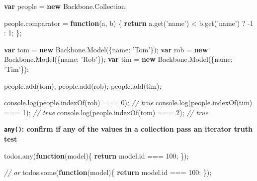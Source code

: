\documentclass[9pt]{book}
\newenvironment{Shaded}{}{}
\newcommand{\KeywordTok}[1]{\textcolor[rgb]{0.00,0.44,0.13}{\textbf{{#1}}}}
\newcommand{\DataTypeTok}[1]{\textcolor[rgb]{0.56,0.13,0.00}{{#1}}}
\newcommand{\DecValTok}[1]{\textcolor[rgb]{0.25,0.63,0.44}{{#1}}}
\newcommand{\StringTok}[1]{\textcolor[rgb]{0.25,0.44,0.63}{{#1}}}
\newcommand{\CommentTok}[1]{\textcolor[rgb]{0.38,0.63,0.69}{\textit{{#1}}}}
\newcommand{\OtherTok}[1]{\textcolor[rgb]{0.00,0.44,0.13}{{#1}}}
\newcommand{\FunctionTok}[1]{\textcolor[rgb]{0.02,0.16,0.49}{{#1}}}
\newcommand{\NormalTok}[1]{{#1}}
\begin{document}
\begin{Shaded}
\begin{Highlighting}[]
\KeywordTok{var} \NormalTok{people = }\KeywordTok{new} \OtherTok{Backbone}\NormalTok{.}\FunctionTok{Collection}\NormalTok{;}

\OtherTok{people}\NormalTok{.}\FunctionTok{comparator} \NormalTok{= }\KeywordTok{function}\NormalTok{(a, b) \{}
  \KeywordTok{return} \OtherTok{a}\NormalTok{.}\FunctionTok{get}\NormalTok{(}\StringTok{'name'}\NormalTok{) < }\OtherTok{b}\NormalTok{.}\FunctionTok{get}\NormalTok{(}\StringTok{'name'}\NormalTok{) ? -}\DecValTok{1} \NormalTok{: }\DecValTok{1}\NormalTok{;}
\NormalTok{\};}

\KeywordTok{var} \NormalTok{tom = }\KeywordTok{new} \OtherTok{Backbone}\NormalTok{.}\FunctionTok{Model}\NormalTok{(\{}\DataTypeTok{name}\NormalTok{: }\StringTok{'Tom'}\NormalTok{\});}
\KeywordTok{var} \NormalTok{rob = }\KeywordTok{new} \OtherTok{Backbone}\NormalTok{.}\FunctionTok{Model}\NormalTok{(\{}\DataTypeTok{name}\NormalTok{: }\StringTok{'Rob'}\NormalTok{\});}
\KeywordTok{var} \NormalTok{tim = }\KeywordTok{new} \OtherTok{Backbone}\NormalTok{.}\FunctionTok{Model}\NormalTok{(\{}\DataTypeTok{name}\NormalTok{: }\StringTok{'Tim'}\NormalTok{\});}

\OtherTok{people}\NormalTok{.}\FunctionTok{add}\NormalTok{(tom);}
\OtherTok{people}\NormalTok{.}\FunctionTok{add}\NormalTok{(rob);}
\OtherTok{people}\NormalTok{.}\FunctionTok{add}\NormalTok{(tim);}

\OtherTok{console}\NormalTok{.}\FunctionTok{log}\NormalTok{(}\OtherTok{people}\NormalTok{.}\FunctionTok{indexOf}\NormalTok{(rob) === }\DecValTok{0}\NormalTok{); }\CommentTok{// true}
\OtherTok{console}\NormalTok{.}\FunctionTok{log}\NormalTok{(}\OtherTok{people}\NormalTok{.}\FunctionTok{indexOf}\NormalTok{(tim) === }\DecValTok{1}\NormalTok{); }\CommentTok{// true}
\OtherTok{console}\NormalTok{.}\FunctionTok{log}\NormalTok{(}\OtherTok{people}\NormalTok{.}\FunctionTok{indexOf}\NormalTok{(tom) === }\DecValTok{2}\NormalTok{); }\CommentTok{// true}
\end{Highlighting}
\end{Shaded}

\textbf{\texttt{any()}: confirm if any of the values in a collection
pass an iterator truth test}

\begin{Shaded}
\begin{Highlighting}[]
\OtherTok{todos}\NormalTok{.}\FunctionTok{any}\NormalTok{(}\KeywordTok{function}\NormalTok{(model)\{}
  \KeywordTok{return} \OtherTok{model}\NormalTok{.}\FunctionTok{id} \NormalTok{=== }\DecValTok{100}\NormalTok{;}
\NormalTok{\});}

\CommentTok{// or}
\OtherTok{todos}\NormalTok{.}\FunctionTok{some}\NormalTok{(}\KeywordTok{function}\NormalTok{(model)\{}
  \KeywordTok{return} \OtherTok{model}\NormalTok{.}\FunctionTok{id} \NormalTok{=== }\DecValTok{100}\NormalTok{;}
\NormalTok{\});}
\end{Highlighting}
\end{Shaded}
\end{document}
